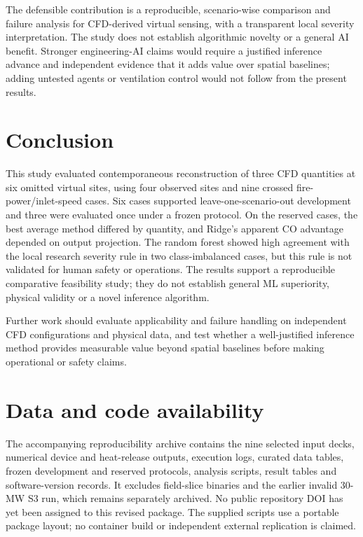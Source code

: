 \documentclass[preprint,12pt,authoryear]{elsarticle}
\begin{document}
The defensible contribution is a reproducible, scenario-wise comparison
and failure analysis for CFD-derived virtual sensing, with a transparent
local severity interpretation. The study does not establish algorithmic
novelty or a general AI benefit. Stronger engineering-AI claims would
require a justified inference advance and independent evidence that it
adds value over spatial baselines; adding untested agents or ventilation
control would not follow from the present results.

\section{Conclusion}
This study evaluated contemporaneous reconstruction of three CFD
quantities at six omitted virtual sites, using four observed sites and
nine crossed fire-power/inlet-speed cases. Six cases supported
leave-one-scenario-out development and three were evaluated once under a
frozen protocol. On the reserved cases, the best average method differed
by quantity, and Ridge's apparent CO advantage depended on output
projection. The random forest showed high agreement with the local
research severity rule in two class-imbalanced cases, but this rule is
not validated for human safety or operations. The results support a
reproducible comparative feasibility study; they do not establish general
ML superiority, physical validity or a novel inference algorithm.

Further work should evaluate applicability and failure handling on
independent CFD configurations and physical data, and test whether a
well-justified inference method provides measurable value beyond spatial
baselines before making operational or safety claims.

\section*{Data and code availability}
The accompanying reproducibility archive contains the nine selected input
decks, numerical device and heat-release outputs, execution logs, curated
data tables, frozen development and reserved protocols, analysis scripts,
result tables and software-version records. It excludes field-slice
binaries and the earlier invalid 30-MW S3 run, which remains separately
archived. No public repository DOI has yet been assigned to this revised
package. The supplied scripts use a portable package layout; no container
build or independent external replication is claimed.
\end{document}
